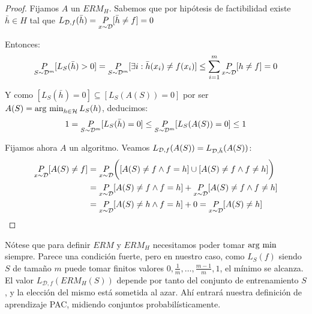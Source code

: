 \begin{proof}
Fijamos $A$ un $ERM_H$. Sabemos que por hipótesis de factibilidad existe $\bar{h} \in H$ tal que
$L_{\mathcal{D},f}(\bar{h}) = \underset{x\sim \mathcal{D}}{P}[\bar{h}\neq f] = 0$

Entonces: 
\[
  \underset{S\sim \mathcal{D}^m}{P}[L_S(\bar{h}) > 0] = \underset{S\sim \mathcal{D}^m}{P}
  [\exists i: \bar{h}(x_i) \neq f(x_i)] \le \sum_{i=1}^m \underset{x\sim \mathcal{D}}{P}[h\neq f] = 0
\]

Y como $[L_S(\bar{h}) = 0] \subseteq [L_S(A(S)) = 0]$ por ser $A(S) = \operatorname*{arg\,\min}_{h\in \mathcal{H}} L_S(h)$, deducimos:
\[
  1 = \underset{S\sim \mathcal{D}^m}{P}[L_S(\bar{h}) = 0] \le \underset{S\sim \mathcal{D}^m}{P}[L_S(A(S)) = 0] \le 1
\]

Fijamos ahora $A$ un algoritmo. Veamos $L_{\mathcal{D},f}(A(S)) = L_{\mathcal{D},\bar{h}}(A(S))$:
  \begin{align*}
  \underset{x\sim \mathcal{D}}{P}[A(S) \neq f] &= \underset{x\sim \mathcal{D}}{P}\bigg([A(S) \neq f \wedge f=h] \cup[A(S) \neq f \wedge f\neq h]\bigg)\\
  &= \underset{x\sim \mathcal{D}}{P}[A(S) \neq f \wedge f=h] + \underset{x\sim \mathcal{D}}{P}[A(S) \neq f \wedge f\neq h]\\
  &= \underset{x\sim \mathcal{D}}{P}[A(S) \neq h \wedge f=h] + 0 = \underset{x\sim \mathcal{D}}{P}[A(S)\neq h]
  \end{align*}
\end{proof}

Nótese que para definir $ERM$ y $ERM_H$ necesitamos poder tomar $\operatorname*{arg\,\min}$ siempre. Parece una condición fuerte,
pero en nuestro caso, como $L_{S}(f)$ siendo $S$ de tamaño $m$ puede tomar finitos valores $0, \frac{1}{m}, \ldots, \frac{m-1}{m},1$,
el mínimo se alcanza. El valor $L_{\mathcal{D},f}(ERM_H(S))$ depende por tanto del conjunto de entrenamiento $S$, y la elección del
mismo está sometida al azar. Ahí entrará nuestra definición de aprendizaje PAC, midiendo conjuntos probabilísticamente.